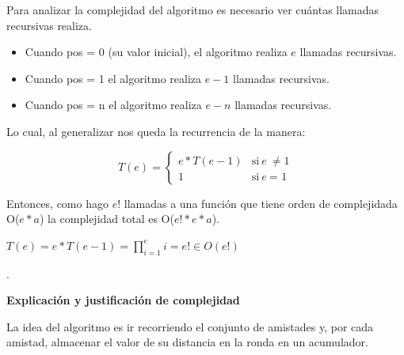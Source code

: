 \documentclass[11pt]{article}
\begin{document}
Para analizar la complejidad del algoritmo es necesario ver cuántas llamadas recursivas realiza.
\begin{itemize}
\item Cuando pos = 0 (su valor inicial), el algoritmo realiza $e$ llamadas recursivas.
\item Cuando pos = 1 el algoritmo realiza $e-1$ llamadas recursivas.
\item Cuando pos = n el algoritmo realiza $e-n$ llamadas recursivas.
\end{itemize}

Lo cual, al generalizar nos queda la recurrencia de la manera:

\vspace{1mm}

\[ T(e) = 
  \begin{cases} 
    e * T(e-1) & \mbox{si} \ e \ \neq \mbox{1} \\
    1 & \mbox{si} \ e \ \mbox{= 1} 
  \end{cases}
\]

\vspace{2mm}

Entonces, como hago $e!$  llamadas a una función que tiene orden de complejidada O($e*a$) la complejidad 
total es O($e!*e*a$).

\begin{center}
$T(e) = e * T(e-1) = \prod_{i=1}^{e} i = e! \in O(e!)$
\end{center}

\vspace{5mm}
\noindent\makebox[\linewidth]{\rule{17cm}{0.4pt}}

.
\\

\vspace{3mm}
\begin{center}
\textbf{Explicación y justificación de complejidad} \\ 
\end{center} 
La idea del algoritmo es ir recorriendo el conjunto de amistades y, por cada amistad, almacenar el valor de 
su distancia en la ronda en un acumulador.
\end{document}
